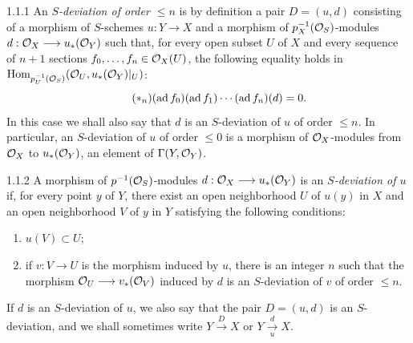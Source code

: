 \begin{definition}{1.1.1}\label{VIIA.1.1.1}
An \emph{$S$-deviation of order $\leq n$} is by definition a pair $D=(u,d)$ consisting of a morphism of $S$-schemes $u:Y\to X$ and a morphism of $p_X^{-1}(\mathcal{O}_S)$-modules $d:\mathcal{O}_X\longrightarrow u_*(\mathcal{O}_Y)$ such that, for every open subset $U$ of $X$ and every sequence of $n+1$ sections $f_0,\ldots,f_n\in\mathcal{O}_X(U)$, the following equality holds in $\operatorname{Hom}_{p_U^{-1}(\mathcal{O}_S)}(\mathcal{O}_U,u_*(\mathcal{O}_Y)|_U)$:
\begin{equation}\tag{$*_n$}
(\operatorname{ad} f_0)(\operatorname{ad} f_1)\cdots(\operatorname{ad} f_n)(d)=0.
\end{equation}
In this case we shall also say that $d$ is an $S$-deviation of $u$ of order $\leq n$. In particular, an $S$-deviation of $u$ of order $\leq0$ is a morphism of $\mathcal{O}_X$-modules from $\mathcal{O}_X$ to $u_*(\mathcal{O}_Y)$, \ie an element of $\Gamma(Y,\mathcal{O}_Y)$.
\end{definition}

\begin{definition}{1.1.2}\label{VIIA.1.1.2}
A morphism of $p^{-1}(\mathcal{O}_S)$-modules $d:\mathcal{O}_X\longrightarrow u_*(\mathcal{O}_Y)$ is an \emph{$S$-deviation of $u$} if, for every point $y$ of $Y$, there exist an open neighborhood $U$ of $u(y)$ in $X$ and an open neighborhood $V$ of $y$ in $Y$ satisfying the following conditions:
\begin{enumerate}[label=\alph*)]
\item $u(V)\subset U$;
\item if $v:V\to U$ is the morphism induced by $u$, there is an integer $n$ such that the morphism $\mathcal{O}_U\longrightarrow v_*(\mathcal{O}_V)$ induced by $d$ is an $S$-deviation of $v$ of order $\leq n$.
\end{enumerate}
\end{definition}
If $d$ is an $S$-deviation of $u$, we also say that the pair $D=(u,d)$ is an $S$-deviation, and we shall sometimes write $Y\xrightarrow{D}X$ or $Y\mathrel{\mathop{\longrightarrow}\limits^{d}_{u}}X$.

